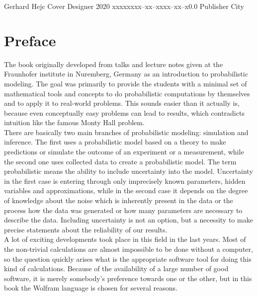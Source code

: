 \documentclass{tstextbook}
\begin{document}
       {Gerhard Hejc}
       {Cover Designer}
       {2020}
       {xxxxx}{xxx--xx--xxxx--xx--x}{0.0}
       {Publisher}
       {City}

\chapter*{Preface}

The book originally developed from talks and lecture notes given at the Fraunhofer institute in Nuremberg, Germany as an introduction to probabilistic modeling. The goal was primarily to provide the students with a minimal set of mathematical tools and concepts to do probabilistic computations by themselves and to apply it to real-world problems. This sounds easier than it actually is, because even conceptually easy problems can lead to results, which contradicts intuition like the famous Monty Hall problem.\\

There are basically two main branches of probabilistic modeling: simulation and inference. The first uses a probabilistic model based on a theory to make predictions or simulate the outcome of an experiment or a measurement, while the second one uses collected data to create a probabilistic model. The term probabilistic means the ability to include uncertainty into the model. Uncertainty in the first case is entering through only imprecisely known parameters,  hidden variables and approximations, while in the second case it depends on the degree of knowledge about the noise which is inherently present in the data or the process how the data was generated or how many parameters are necessary to describe the data. Including uncertainty is not an option, but a necessity to make precise statements about the reliability of our results.  \\    

A lot of exciting developments took place in this field in the last years. Most of the non-trivial calculations are almost impossible to be done without a computer, so the question quickly arises what is the appropriate software tool for doing this kind of calculations. Because of the availability of a large number of good software, it is merely somebody's preference towards one or the other, but in this book the Wolfram language is chosen for several reasons.\\
\end{document}
